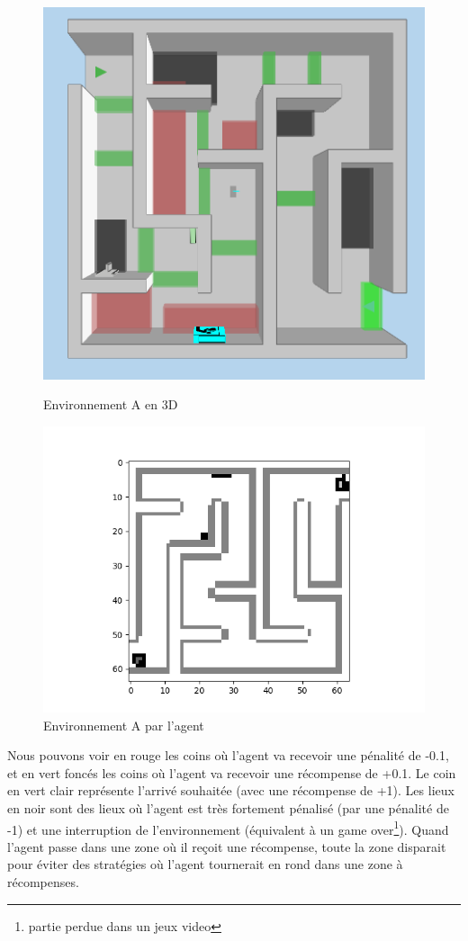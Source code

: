 \begin{figure}[h!]
\centering
\begin{minipage}{.5\textwidth}
  \centering
  \includegraphics[width=.5\linewidth]{./assets/SESTAR/envsestaragent.png}
  \caption{Environnement A en 3D}
  \label{fig:test1}
\end{minipage}%
\begin{minipage}{.5\textwidth}
  \centering
  \includegraphics[width=.65\linewidth]{./assets/SESTAR/vue_agent_1.png}
  \caption{\small{Environnement A par l'agent}}
  \label{fig:test2}
\end{minipage}
\end{figure}

Nous pouvons voir en rouge les coins où l'agent va recevoir une pénalité de -0.1, et en vert foncés les coins où l'agent va recevoir une récompense de +0.1. Le coin en vert clair représente l'arrivé souhaitée (avec une récompense de +1). Les lieux en noir sont des lieux où l'agent est très fortement pénalisé (par une pénalité de -1) et une interruption de l'environnement (équivalent à un game over\footnote{partie perdue dans un jeux video}). Quand l'agent passe dans une zone où il reçoit une récompense, toute la zone disparait pour éviter des stratégies où l'agent tournerait en rond dans une zone à récompenses. 

